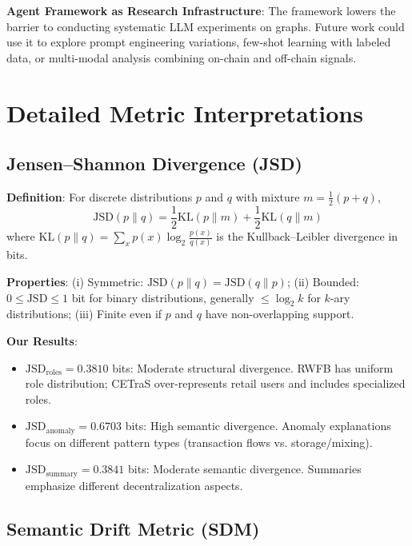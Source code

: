 \textbf{Agent Framework as Research Infrastructure}: The framework lowers the barrier to conducting systematic LLM experiments on graphs. Future work could use it to explore prompt engineering variations, few-shot learning with labeled data, or multi-modal analysis combining on-chain and off-chain signals.


\section{Detailed Metric Interpretations}\label{sec:interpretations}

\subsection{Jensen--Shannon Divergence (JSD)}

\textbf{Definition}: For discrete distributions $p$ and $q$ with mixture $m = \frac{1}{2}(p+q)$,
\begin{equation}
\text{JSD}(p \parallel q) = \frac{1}{2}\text{KL}(p \parallel m) + \frac{1}{2}\text{KL}(q \parallel m)
\end{equation}
where $\text{KL}(p \parallel q) = \sum_x p(x) \log_2 \frac{p(x)}{q(x)}$ is the Kullback--Leibler divergence in bits.

\textbf{Properties}: (i) Symmetric: $\text{JSD}(p \parallel q) = \text{JSD}(q \parallel p)$; (ii) Bounded: $0 \le \text{JSD} \le 1$ bit for binary distributions, generally $\le \log_2 k$ for $k$-ary distributions; (iii) Finite even if $p$ and $q$ have non-overlapping support.

\textbf{Our Results}:
\begin{itemize}
    \item $\text{JSD}_{\text{roles}} = 0.3810$ bits: Moderate structural divergence. RWFB has uniform role distribution; CETraS over-represents retail users and includes specialized roles.
    \item $\text{JSD}_{\text{anomaly}} = 0.6703$ bits: High semantic divergence. Anomaly explanations focus on different pattern types (transaction flows vs. storage/mixing).
    \item $\text{JSD}_{\text{summary}} = 0.3841$ bits: Moderate semantic divergence. Summaries emphasize different decentralization aspects.
\end{itemize}

\subsection{Semantic Drift Metric (SDM)}

